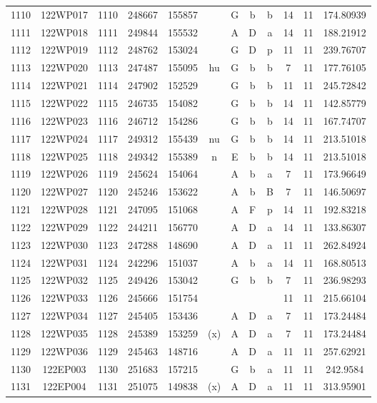 \begin{tabular}{|*{12}{c|}}
1110 & 122WP017 & 1110 & 248667 & 155857 &  & G & b & b & 14 & 11 & 174.80939 \\ 
1111 & 122WP018 & 1111 & 249844 & 155532 &  & A & D & a & 14 & 11 & 188.21912 \\ 
1112 & 122WP019 & 1112 & 248762 & 153024 &  & G & D & p & 11 & 11 & 239.76707 \\ 
1113 & 122WP020 & 1113 & 247487 & 155095 & hu & G & b & b & 7 & 11 & 177.76105 \\ 
1114 & 122WP021 & 1114 & 247902 & 152529 &  & G & b & b & 11 & 11 & 245.72842 \\ 
1115 & 122WP022 & 1115 & 246735 & 154082 &  & G & b & b & 14 & 11 & 142.85779 \\ 
1116 & 122WP023 & 1116 & 246712 & 154286 &  & G & b & b & 14 & 11 & 167.74707 \\ 
1117 & 122WP024 & 1117 & 249312 & 155439 & nu & G & b & b & 14 & 11 & 213.51018 \\ 
1118 & 122WP025 & 1118 & 249342 & 155389 & n & E & b & b & 14 & 11 & 213.51018 \\ 
1119 & 122WP026 & 1119 & 245624 & 154064 &  & A & b & a & 7 & 11 & 173.96649 \\ 
1120 & 122WP027 & 1120 & 245246 & 153622 &  & A & b & B & 7 & 11 & 146.50697 \\ 
1121 & 122WP028 & 1121 & 247095 & 151068 &  & A & F & p & 14 & 11 & 192.83218 \\ 
1122 & 122WP029 & 1122 & 244211 & 156770 &  & A & D & a & 14 & 11 & 133.86307 \\ 
1123 & 122WP030 & 1123 & 247288 & 148690 &  & A & D & a & 11 & 11 & 262.84924 \\ 
1124 & 122WP031 & 1124 & 242296 & 151037 &  & A & b & a & 14 & 11 & 168.80513 \\ 
1125 & 122WP032 & 1125 & 249426 & 153042 &  & G & b & b & 7 & 11 & 236.98293 \\ 
1126 & 122WP033 & 1126 & 245666 & 151754 &  &  &  &  & 11 & 11 & 215.66104 \\ 
1127 & 122WP034 & 1127 & 245405 & 153436 &  & A & D & a & 7 & 11 & 173.24484 \\ 
1128 & 122WP035 & 1128 & 245389 & 153259 & (x) & A & D & a & 7 & 11 & 173.24484 \\ 
1129 & 122WP036 & 1129 & 245463 & 148716 &  & A & D & a & 11 & 11 & 257.62921 \\ 
1130 & 122EP003 & 1130 & 251683 & 157215 &  & G & b & a & 11 & 11 & 242.9584 \\ 
1131 & 122EP004 & 1131 & 251075 & 149838 & (x) & A & D & a & 11 & 11 & 313.95901 \\ 

\end{tabular}
